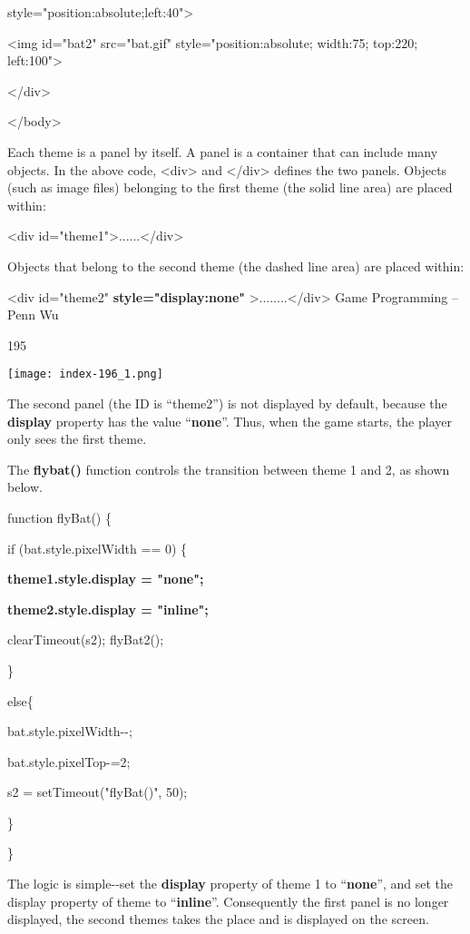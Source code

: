 \documentclass[
]{article}
\begin{document}
style="position:absolute;left:40"\textgreater{}

\textless img id="bat2" src="bat.gif" style="position:absolute;
width:75; top:220; left:100"\textgreater{}

\textless/div\textgreater{}

\textless/body\textgreater{}

Each theme is a panel by itself. A panel is a container that can include
many objects. In the above code, \textless div\textgreater{} and
\textless/div\textgreater{} defines the two panels. Objects (such as
image files) belonging to the first theme (the solid line area) are
placed within:

\textless div id="theme1"\textgreater......\textless/div\textgreater{}

Objects that belong to the second theme (the dashed line area) are
placed within:

\textless div id="theme2" \textbf{style="display:none"}
\textgreater........\textless/div\textgreater{} Game Programming -- Penn
Wu

195

\protect\hypertarget{index_split_011.htmlux5cux23p196}{}{}\texttt{[image: index-196\_1.png]}

The second panel (the ID is ``theme2'') is not displayed by default,
because the \textbf{display} property has the value ``\textbf{none}''.
Thus, when the game starts, the player only sees the first theme.

The \textbf{flybat()} function controls the transition between theme 1
and 2, as shown below.

function flyBat() \{

if (bat.style.pixelWidth == 0) \{

\textbf{theme1.style.display = "none";}

\textbf{theme2.style.display = "inline";}

clearTimeout(s2); flyBat2();

\}

else\{

bat.style.pixelWidth-\/-;

bat.style.pixelTop-=2;

s2 = setTimeout("flyBat()", 50);

\}

\}

The logic is simple-\/-set the \textbf{display} property of theme 1 to
``\textbf{none}'', and set the display property of theme to
``\textbf{inline}''. Consequently the first panel is no longer
displayed, the second themes takes the place and is displayed on the
screen.
\end{document}
